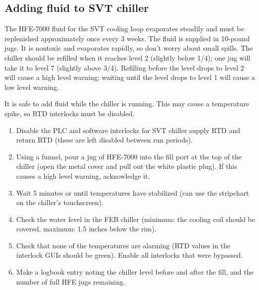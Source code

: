 \subsection{Adding fluid to SVT chiller}
\label{sec:proc_svt_chiller_refill}
The HFE-7000 fluid for the SVT cooling loop evaporates steadily and must be replenished approximately once every 3 weeks.
The fluid is supplied in 10-pound jugs. It is nontoxic and evaporates rapidly, so don't worry about small spills.
The chiller should be refilled when it reaches level 2 (slightly below 1/4); one jug will take it to level 7 (slightly above 3/4).
Refilling before the level drops to level 2 will cause a high level warning; waiting until the level drops to level 1 will cause a low level warning.

It is safe to add fluid while the chiller is running. This may cause a temperature spike, so RTD interlocks must be disabled.

\begin{enumerate}
    \item Disable the PLC and software interlocks for SVT chiller supply RTD and return RTD (these are left disabled between run periods).
    \item Using a funnel, pour a jug of HFE-7000 into the fill port at the top of the chiller (open the metal cover and pull out the white plastic plug). If this causes a high level warning, acknowledge it.
    \item Wait 5 minutes or until temperatures have stabilized (can use the stripchart on the chiller's touchscreen).
    \item Check the water level in the FEB chiller (minimum: the cooling coil should be covered, maximum: 1.5 inches below the rim).
    \item Check that none of the temperatures are alarming (RTD values in the interlock GUIs should be green). Enable all interlocks that were bypassed.
    \item Make a logbook entry noting the chiller level before and after the fill, and the number of full HFE jugs remaining.
\end{enumerate}

